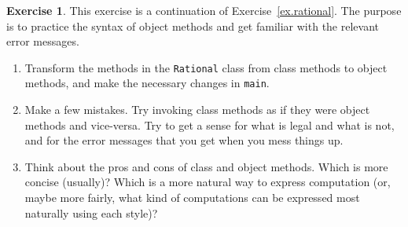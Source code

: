 \documentclass[12pt]{book}
\theoremstyle{definition}
\newtheorem{excz}{Exercise}[chapter]
\newenvironment{exercise}{\bigskip\begin{excz}\mbox{}}{\end{excz}}
\begin{document}
\begin{exercise}

This exercise is a continuation of Exercise~\ref{ex.rational}.
The purpose is to practice the syntax of object methods and
get familiar with the relevant error messages.

\begin{enumerate}

\item Transform the methods in the {\tt Rational} class
from class methods to object methods, and make the necessary
changes in {\tt main}.

\item Make a few mistakes.  Try invoking class methods as if
they were object methods and vice-versa.  Try to get a sense for
what is legal and what is not, and for the error messages that
you get when you mess things up.

\item Think about the pros and cons of
class and object methods.  Which is more concise (usually)?
Which is a more natural way to express computation (or, maybe
more fairly, what kind of computations can be expressed most
naturally using each style)?

\end{enumerate}
\end{exercise}
\end{document}
